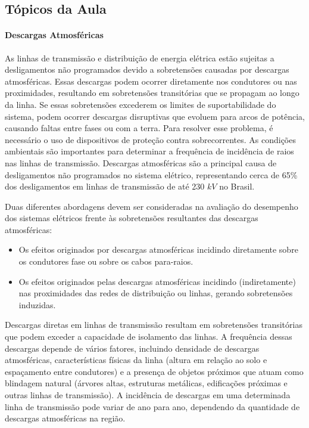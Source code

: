\documentclass[a4paper, 12pt, onecolumn,singlespacing]{article}
\begin{document}
	\subsection{Tópicos da Aula}
	
	\paragraph{Descargas Atmosféricas} As linhas de transmissão e distribuição de energia elétrica estão sujeitas a desligamentos não programados devido a sobretensões causadas por descargas atmosféricas. Essas descargas podem ocorrer diretamente nos condutores ou nas proximidades, resultando em sobretensões transitórias que se propagam ao longo da linha. Se essas sobretensões excederem os limites de suportabilidade do sistema, podem ocorrer descargas disruptivas que evoluem para arcos de potência, causando faltas entre fases ou com a terra. Para resolver esse problema, é necessário o uso de dispositivos de proteção contra sobrecorrentes. As condições ambientais são importantes para determinar a frequência de incidência de raios nas linhas de transmissão. Descargas atmosféricas são a principal causa de desligamentos não programados no sistema elétrico, representando cerca de 65\% dos desligamentos em linhas de transmissão de até 230 $kV$ no Brasil.
	
	Duas diferentes abordagens devem ser consideradas na avaliação do desempenho dos sistemas elétricos frente às sobretensões resultantes das descargas atmosféricas:
	
	\begin{itemize}
		\item Os efeitos originados por descargas atmosféricas incidindo diretamente sobre os condutores fase ou sobre os cabos para-raios.
		\item Os efeitos originados pelas descargas atmosféricas incidindo (indiretamente) nas proximidades das redes de distribuição ou linhas, gerando sobretensões induzidas.
	\end{itemize}
	
	Descargas diretas em linhas de transmissão resultam em sobretensões transitórias que podem exceder a capacidade de isolamento das linhas. A frequência dessas descargas depende de vários fatores, incluindo densidade de descargas atmosféricas, características físicas da linha (altura em relação ao solo e espaçamento entre condutores) e a presença de objetos próximos que atuam como blindagem natural (árvores altas, estruturas metálicas, edificações próximas e outras linhas de transmissão). A incidência de descargas em uma determinada linha de transmissão pode variar de ano para ano, dependendo da quantidade de descargas atmosféricas na região.
	
\end{document}

